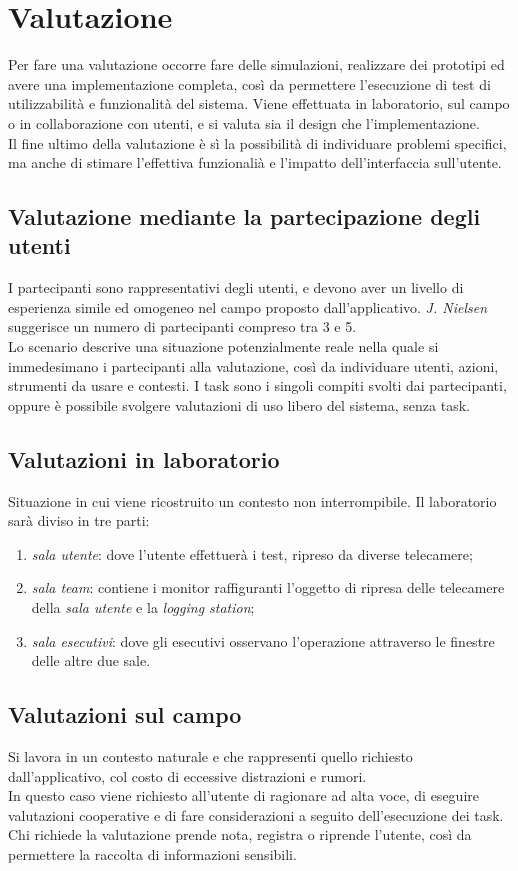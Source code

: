 \section{Valutazione}
Per fare una valutazione occorre fare delle simulazioni, realizzare dei prototipi ed avere una implementazione completa, cos\`i da permettere l'esecuzione di test di utilizzabilit\`a e funzionalit\`a del sistema. Viene effettuata in laboratorio, sul campo o in collaborazione con utenti, e si valuta sia il design che l'implementazione. \\
Il fine ultimo della valutazione \`e s\`i la possibilit\`a di individuare problemi specifici, ma anche di stimare l'effettiva funzionali\`a e l'impatto dell'interfaccia sull'utente.

\subsection{Valutazione mediante la partecipazione degli utenti}
I partecipanti sono rappresentativi degli utenti, e devono aver un livello di esperienza simile ed omogeneo nel campo proposto dall'applicativo. \textit{J. Nielsen} suggerisce un numero di partecipanti compreso tra 3 e 5. \\
Lo scenario descrive una situazione potenzialmente reale nella quale si immedesimano i partecipanti alla valutazione, cos\`i da individuare utenti, azioni, strumenti da usare e contesti. I task sono i singoli compiti svolti dai partecipanti, oppure \`e possibile svolgere valutazioni di uso libero del sistema, senza task.

\subsection{Valutazioni in laboratorio}
Situazione in cui viene ricostruito un contesto non interrompibile. Il laboratorio sar\`a diviso in tre parti:
\begin{enumerate}
	\item \textit{sala utente}: dove l'utente effettuer\`a i test, ripreso da diverse telecamere;
	\item \textit{sala team}: contiene i monitor raffiguranti l'oggetto di ripresa delle telecamere della \textit{sala utente} e la \textit{logging station};
	\item \textit{sala esecutivi}: dove gli esecutivi osservano l'operazione attraverso le finestre delle altre due sale.
\end{enumerate}

\subsection{Valutazioni sul campo}
Si lavora in un contesto naturale e che rappresenti quello richiesto dall'applicativo, col costo di eccessive distrazioni e rumori. \\
In questo caso viene richiesto all'utente di ragionare ad alta voce, di eseguire valutazioni cooperative e di fare considerazioni a seguito dell'esecuzione dei task. Chi richiede la valutazione prende nota, registra o riprende l'utente, cos\`i da permettere la raccolta di informazioni sensibili.

